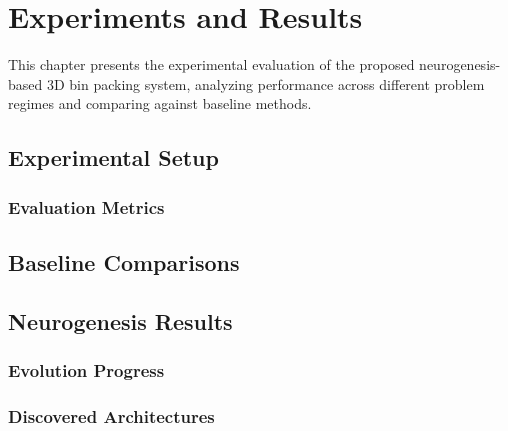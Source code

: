 \chapter{Experiments and Results}

This chapter presents the experimental evaluation of the proposed neurogenesis-based 3D bin packing system, analyzing performance across different problem regimes and comparing against baseline methods.

\section{Experimental Setup}


\subsection{Evaluation Metrics}


\section{Baseline Comparisons}


\section{Neurogenesis Results}

\subsection{Evolution Progress}


\subsection{Discovered Architectures}

